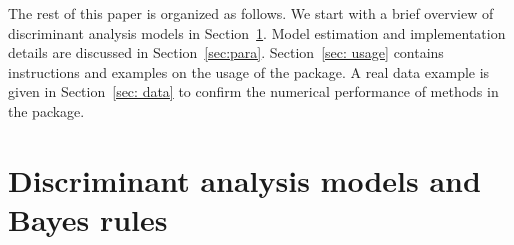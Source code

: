 %
%

The rest of this paper is organized as follows. We start with a brief overview of discriminant analysis models in Section~\ref{Sec: models}. Model estimation and implementation details are discussed in Section~\ref{sec:para}. Section~\ref{sec: usage} contains instructions and examples on the usage of the package. A real data example is given in Section~\ref{sec: data} to confirm the numerical performance of methods in the package.


\section{Discriminant analysis models and Bayes rules}\label{Sec: models}

